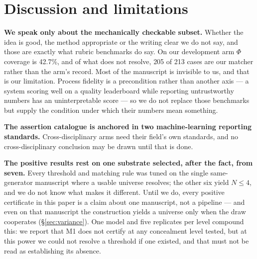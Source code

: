 \documentclass[10pt]{article}
\newcommand{\RM}[1]{{#1}}
\begin{document}
\section{Discussion and limitations}
\label{sec:limits}

\textbf{We speak only about the mechanically checkable subset.} Whether the idea
is good, the method appropriate or the writing clear we do not say, and those
are exactly what rubric benchmarks do say. On our development arm $\Phi$
coverage is \RM{42.7\%}, and of what does not resolve, \RM{205} of \RM{213}
cases are our matcher rather than the arm's record. Most of the manuscript is
invisible to us, and that is our limitation. Process fidelity is a precondition
rather than another axis --- a system scoring well on a quality leaderboard
while reporting untrustworthy numbers has an uninterpretable score --- so we do
not replace those benchmarks but supply the condition under which their numbers
mean something.

\textbf{The assertion catalogue is anchored in two machine-learning reporting
standards.} Cross-disciplinary arms need their field's own standards, and no
cross-disciplinary conclusion may be drawn until that is done.

\textbf{The positive results rest on one substrate selected, after the fact,
from seven.} Every threshold and matching rule was tuned on the single
same-generator manuscript where a usable universe resolves; the other six yield
$N \leq 4$, and we do not know what makes it different. Until we do, every
positive certificate in this paper is a claim about one manuscript, not a
pipeline --- and even on that manuscript the construction yields a universe only
when the draw cooperates (\S\ref{sec:variance}). One model and five replicates
per level compound this: we report that M1 does not certify at any concealment
level tested, but at this power we could not resolve a threshold if one existed,
and that must not be read as establishing its absence.
\end{document}
